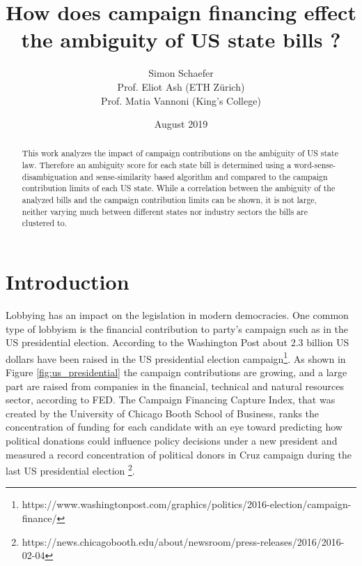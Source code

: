 \documentclass{custom_report}
\begin{document}
\title{How does campaign financing effect the ambiguity of US state bills ?}
\author{Simon Schaefer \\ Prof. Eliot Ash (ETH Z{\"u}rich) \\ Prof. Matia Vannoni (King's College)}
\date{August 2019}

\maketitle

\begin{abstract}
This work analyzes the impact of campaign contributions on the ambiguity of US state law. Therefore an ambiguity score for each state bill is determined using a word-sense-disambiguation and sense-similarity based algorithm and compared to the campaign contribution limits of each US state. While a correlation between the ambiguity of the analyzed bills and the campaign contribution limits can be shown, it is not large, neither varying much between different states nor industry sectors the bills are clustered to.
\end{abstract}

\maketitle
\tableofcontents

\chapter{Introduction}
\label{cha:introduction}

Lobbying has an impact on the legislation in modern democracies. One common type of lobbyism is the financial contribution to party's campaign such as in the US presidential election. According to the Washington Post about 2.3 billion US dollars have been raised in the US presidential election campaign\footnote{https://www.washingtonpost.com/graphics/politics/2016-election/campaign-finance/}. As shown in Figure \ref{fig:us_presidential} the campaign contributions are growing, and a large part are raised from companies in the financial, technical and natural resources sector, according to FED. The Campaign Financing Capture Index, that was created by the University of Chicago Booth School of Business, ranks the concentration of funding for each candidate with an eye toward predicting how political donations could influence policy decisions under a new president and measured a record concentration of political donors in Cruz campaign during the last US presidential election  \footnote{https://news.chicagobooth.edu/about/newsroom/press-releases/2016/2016-02-04}. 
\end{document}
